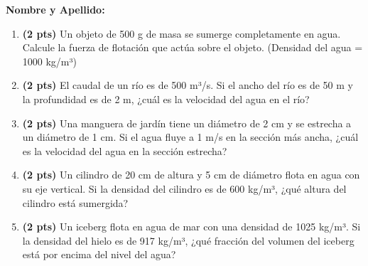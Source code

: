 \documentclass[a4paper,10pt]{article}
\begin{document}
\pagestyle{empty}

\begin{minipage}[t]{0.45\textwidth}
    \begin{center}

        \textbf{Nombre y Apellido: \underline{\hspace{4cm}}}
    \end{center}


    \begin{enumerate}
        \item \textbf{(2 pts)} Un objeto de 500 g de masa se sumerge completamente en agua. Calcule la fuerza de flotación que actúa sobre el objeto. (Densidad del agua = 1000 kg/m³)
        
        

            \item \textbf{(2 pts)} El caudal de un río es de 500 m³/s. Si el ancho del río es de 50 m y la profundidad es de 2 m, ¿cuál es la velocidad del agua en el río?
        
        \item \textbf{(2 pts)} Una manguera de jardín tiene un diámetro de 2 cm y se estrecha a un diámetro de 1 cm. Si el agua fluye a 1 m/s en la sección más ancha, ¿cuál es la velocidad del agua en la sección estrecha?
        
        \item \textbf{(2 pts)} Un cilindro de 20 cm de altura y 5 cm de diámetro flota en agua con su eje vertical. Si la densidad del cilindro es de 600 kg/m³, ¿qué altura del cilindro está sumergida?
        
  
        
        \item \textbf{(2 pts)} Un iceberg flota en agua de mar con una densidad de 1025 kg/m³. Si la densidad del hielo es de 917 kg/m³, ¿qué fracción del volumen del iceberg está por encima del nivel del agua?
    \end{enumerate}
\end{minipage}
\hfill
\end{document}
